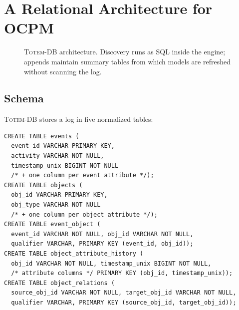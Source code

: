 \documentclass[sigconf, nonacm]{acmart}
\newcommand{\sys}{\textsc{Totem-DB}\xspace}
\newcommand{\ocel}{OCEL~2.0\xspace}
\begin{document}
\section{A Relational Architecture for OCPM}
\label{sec:framework}

\begin{figure}
\centering
{}
\caption{\sys architecture. Discovery runs as SQL inside the engine; appends maintain summary tables from which models are refreshed without scanning the log.}
\label{fig:arch}
\end{figure}

\subsection{Schema}
\label{sec:schema}

\sys stores a log in five normalized tables:

\begin{lstlisting}[caption={The \sys schema (attribute columns are discovered at import time; abbreviated).},label={lst:schema}]
CREATE TABLE events (
  event_id VARCHAR PRIMARY KEY,
  activity VARCHAR NOT NULL,
  timestamp_unix BIGINT NOT NULL
  /* + one column per event attribute */);
CREATE TABLE objects (
  obj_id VARCHAR PRIMARY KEY,
  obj_type VARCHAR NOT NULL
  /* + one column per object attribute */);
CREATE TABLE event_object (
  event_id VARCHAR NOT NULL, obj_id VARCHAR NOT NULL,
  qualifier VARCHAR, PRIMARY KEY (event_id, obj_id));
CREATE TABLE object_attribute_history (
  obj_id VARCHAR NOT NULL, timestamp_unix BIGINT NOT NULL,
  /* attribute columns */ PRIMARY KEY (obj_id, timestamp_unix));
CREATE TABLE object_relations (
  source_obj_id VARCHAR NOT NULL, target_obj_id VARCHAR NOT NULL,
  qualifier VARCHAR, PRIMARY KEY (source_obj_id, target_obj_id));
\end{lstlisting}
\end{document}

